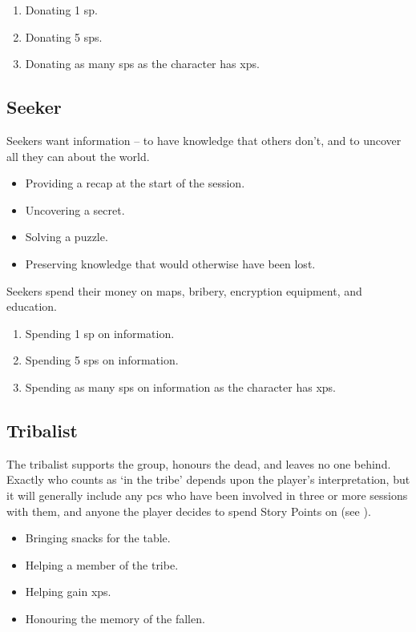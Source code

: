 \begin{multicols}{2}
\begin{enumerate}
  \item
  Donating 1 \gls{sp}.
  \item
  Donating 5 \glspl{sp}.
  \item
  Donating as many \glspl{sp} as the character has \glspl{xp}.
\end{enumerate}


\subsection{Seeker}

Seekers want information -- to have knowledge that others don't, and to uncover all they can about the world.

\begin{itemize}
  \item
  Providing a recap at the start of the session.
  \item
  Uncovering a secret.
  \item
  Solving a puzzle.
  \item
  Preserving knowledge that would otherwise have been lost.
\end{itemize}

Seekers spend their money on maps, bribery, encryption equipment, and education.

\begin{enumerate}
  \item
  Spending 1 \gls{sp} on information.
  \item
  Spending 5 \glspl{sp} on information.
  \item
  Spending as many \glspl{sp} on information as the character has \glspl{xp}.
\end{enumerate}

\subsection{Tribalist}

The tribalist supports the group, honours the dead, and leaves no one behind.
Exactly who counts as `in the tribe' depends upon the player's interpretation, but it will generally include any \glspl{pc} who have been involved in three or more sessions with them, and anyone the player decides to spend Story Points on (see ).

\begin{itemize}
  \item
  Bringing snacks for the table.
  \item
  Helping a member of the tribe.
  \item
  Helping  gain \glspl{xp}.
  \item
  Honouring the memory of the fallen.
\end{itemize}


\end{multicols}
